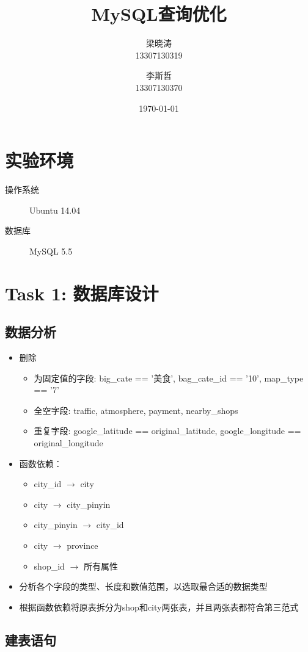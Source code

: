 \documentclass[a4paper, 11pt, nofonts, nocap, fancyhdr]{ctexart}
\title{MySQL查询优化}
\author
{
	梁晓涛\\
	13307130319
	\and
	李斯哲\\
	13307130370
}
\date{\today}
\begin{document}
\maketitle
\tableofcontents
\setcounter{page}{0}
\thispagestyle{empty}
\newpage

\section{实验环境}
\begin{description}
	\item[操作系统] Ubuntu 14.04
	\item[数据库] MySQL 5.5
\end{description}

\section{Task 1: 数据库设计}

\subsection{数据分析}
\begin{itemize}
	\item 删除
		\begin{itemize}
			\item 为固定值的字段: big_cate == '美食', bag_cate_id == '10', map_type == '7'
			\item 全空字段: traffic, atmosphere, payment, nearby_shops
			\item 重复字段: google_latitude == original_latitude, google_longitude == original_longitude
		\end{itemize}
	\item 函数依赖：
		\begin{itemize}
			\item city_id $\to$ city
			\item city $\to$ city_pinyin
			\item city_pinyin $\to$ city_id
			\item city $\to$ province
			\item shop_id $\to$ 所有属性
		\end{itemize}
	\item 分析各个字段的类型、长度和数值范围，以选取最合适的数据类型
	\item 根据函数依赖将原表拆分为shop和city两张表，并且两张表都符合第三范式
\end{itemize}

\subsection{建表语句}

\end{document}
